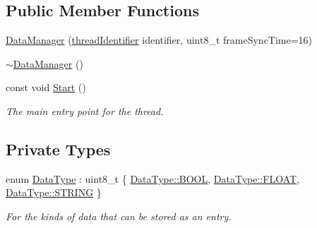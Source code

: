 \subsection*{Public Member Functions}
\begin{DoxyCompactItemize}
\item 
\hyperlink{class_m_p_e_1_1_data_manager_a1af39853286eeaf8850b9e326ea24205}{Data\+Manager} (\hyperlink{namespace_m_p_e_a16447295e3105bd2ba2a9ea303566175}{thread\+Identifier} identifier, uint8\+\_\+t frame\+Sync\+Time=16)
\item 
\hyperlink{class_m_p_e_1_1_data_manager_ab6bdecd89d27d69d790a864175f8cf52}{$\sim$\+Data\+Manager} ()
\item 
const void \hyperlink{class_m_p_e_1_1_data_manager_aa8d6f1ef687afb532d968a3c1a42f324}{Start} ()
\begin{DoxyCompactList}\small\item\em The main entry point for the thread. \end{DoxyCompactList}\end{DoxyCompactItemize}
\subsection*{Private Types}
\begin{DoxyCompactItemize}
\item 
enum \hyperlink{class_m_p_e_1_1_data_manager_aeebd98a9feed805f5ebd63276f003f5f}{Data\+Type} \+: uint8\+\_\+t \{ \hyperlink{class_m_p_e_1_1_data_manager_aeebd98a9feed805f5ebd63276f003f5faa97b2c144243b2b9d2c593ec268b62f5}{Data\+Type\+::\+B\+O\+OL}, 
\hyperlink{class_m_p_e_1_1_data_manager_aeebd98a9feed805f5ebd63276f003f5fae738c26bf4ce1037fa81b039a915cbf6}{Data\+Type\+::\+F\+L\+O\+AT}, 
\hyperlink{class_m_p_e_1_1_data_manager_aeebd98a9feed805f5ebd63276f003f5fa63b588d5559f64f89a416e656880b949}{Data\+Type\+::\+S\+T\+R\+I\+NG}
 \}\begin{DoxyCompactList}\small\item\em For the kinds of data that can be stored as an entry. \end{DoxyCompactList}
\end{DoxyCompactItemize}
